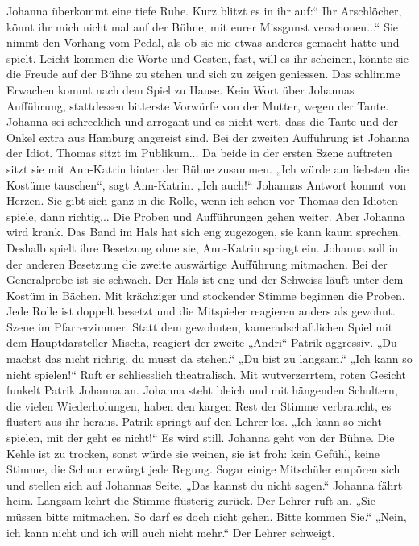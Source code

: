 Johanna  überkommt eine tiefe Ruhe. Kurz blitzt es in ihr auf:“ Ihr Arschlöcher, könnt ihr mich nicht mal auf der Bühne, mit eurer Missgunst verschonen...“ Sie nimmt den Vorhang vom Pedal, als  ob sie nie etwas anderes gemacht hätte und spielt. Leicht kommen die Worte und Gesten, fast, will es ihr scheinen, könnte sie die Freude auf der Bühne zu stehen und sich zu zeigen geniessen.
Das schlimme Erwachen kommt nach dem Spiel zu Hause. Kein Wort über Johannas Aufführung, stattdessen bitterste Vorwürfe von der Mutter, wegen der Tante. Johanna sei schrecklich und arrogant und es nicht wert, dass die Tante und der Onkel extra aus Hamburg angereist sind. 
Bei der zweiten Aufführung ist Johanna der Idiot. Thomas sitzt im Publikum...
Da beide in der ersten Szene auftreten sitzt sie mit Ann-Katrin hinter der Bühne zusammen. „Ich würde am liebsten die Kostüme tauschen“, sagt Ann-Katrin. „Ich auch!“ Johannas Antwort kommt von Herzen. Sie gibt sich ganz in die Rolle, wenn ich schon vor Thomas den Idioten spiele, dann richtig...
Die Proben und Aufführungen gehen weiter. Aber Johanna wird krank. Das Band im Hals hat sich eng zugezogen, sie kann kaum sprechen. Deshalb spielt ihre Besetzung ohne sie, Ann-Katrin springt ein.
Johanna soll in der anderen Besetzung die zweite auswärtige Aufführung mitmachen. Bei der Generalprobe ist sie schwach. Der Hals ist eng und der Schweiss läuft unter dem Kostüm in Bächen. Mit krächziger und stockender Stimme beginnen die Proben. Jede Rolle ist doppelt besetzt und die Mitspieler reagieren anders als gewohnt.
Szene im Pfarrerzimmer. Statt dem gewohnten, kameradschaftlichen Spiel mit dem Hauptdarsteller Mischa, reagiert der zweite „Andri“ Patrik aggressiv. 
„Du machst das nicht richrig, du musst da stehen.“ „Du bist zu langsam.“ „Ich kann so nicht spielen!“ Ruft er schliesslich theatralisch. Mit wutverzerrtem, roten Gesicht funkelt Patrik  Johanna an. Johanna steht bleich und mit hängenden Schultern, die vielen Wiederholungen, haben den kargen Rest der Stimme verbraucht, es flüstert aus ihr heraus. Patrik springt auf den Lehrer los. „Ich kann so nicht spielen, mit der geht es nicht!“
Es wird still. Johanna geht von der Bühne. Die Kehle ist zu trocken, sonst würde sie weinen, sie ist froh: kein Gefühl, keine Stimme, die Schnur erwürgt jede Regung. 
Sogar einige Mitschüler empören sich und stellen sich auf Johannas Seite. „Das kannst du nicht sagen.“ Johanna fährt heim. Langsam kehrt die Stimme flüsterig zurück. Der Lehrer ruft an. „Sie müssen bitte mitmachen. So darf es doch nicht gehen. Bitte kommen Sie.“ „Nein, ich kann nicht und ich will auch nicht mehr.“ Der Lehrer schweigt.
